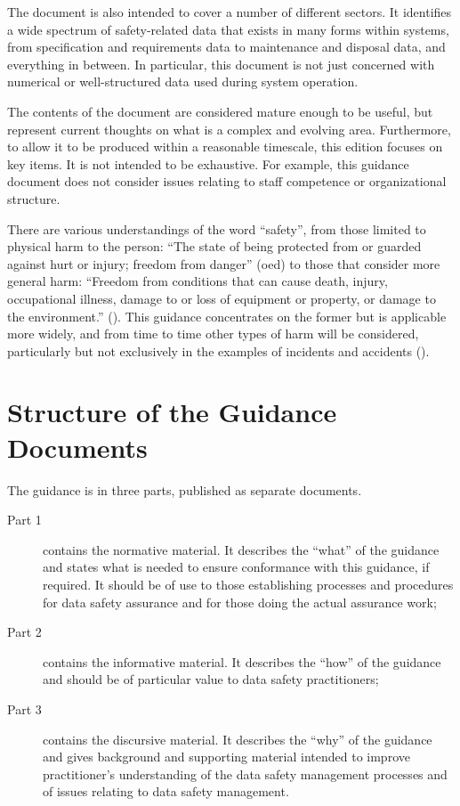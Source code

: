 The document is also intended to cover a number of different sectors. It identifies a wide spectrum of safety-related data that exists in many forms within systems, from specification and requirements data to maintenance and disposal data, and everything in between. In particular, this document is not just concerned with numerical or well-structured data used during system operation.

The contents of the document are considered mature enough to be useful, but represent current thoughts on what is a complex and evolving area. Furthermore, to allow it to be produced within a reasonable timescale, this edition focuses on key items. It is not intended to be exhaustive. For example, this guidance document does not consider issues relating to staff competence or organizational structure.

There are various understandings of the word ``\gls{safety}'', from those limited to physical harm to the person: ``The state of being protected from or guarded against hurt or injury; freedom from danger'' (\gls{oed}) to those that consider more general harm: ``Freedom from conditions that can cause death, injury, occupational
illness, damage to or loss of equipment or property, or damage to the environment.'' (\cite{citation:milstd882}). This guidance concentrates on the former but is applicable more widely, and from time to time other types of harm will be considered, particularly but not exclusively in the examples of incidents and accidents ().

\section{Structure of the Guidance Documents}
The guidance is in three parts, published as separate documents.
\begin{description}
	\item[Part 1] contains the normative material. It describes the ``what'' of the guidance and states what is needed to ensure conformance with this guidance, if required. It should be of use to those establishing processes and procedures for data safety assurance and for those doing the actual assurance work;
	\item[Part 2] contains the informative material. It describes the ``how'' of the guidance and should be of particular value to data safety practitioners;
	\item[Part 3] contains the discursive material. It describes the ``why'' of the guidance and gives background and supporting material intended to improve practitioner's understanding of the data safety management processes and of issues relating to data safety management.
\end{description}

